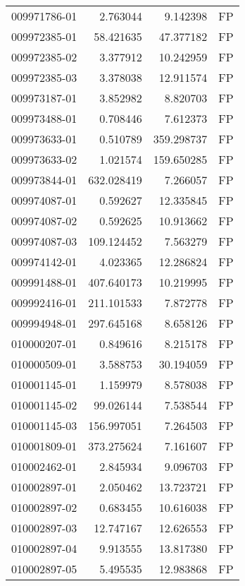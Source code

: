 \begin{tabular}{lrrl}
009971786-01 &    2.763044 &       9.142398 &   FP \\
009972385-01 &   58.421635 &      47.377182 &   FP \\
009972385-02 &    3.377912 &      10.242959 &   FP \\
009972385-03 &    3.378038 &      12.911574 &   FP \\
009973187-01 &    3.852982 &       8.820703 &   FP \\
009973488-01 &    0.708446 &       7.612373 &   FP \\
009973633-01 &    0.510789 &     359.298737 &   FP \\
009973633-02 &    1.021574 &     159.650285 &   FP \\
009973844-01 &  632.028419 &       7.266057 &   FP \\
009974087-01 &    0.592627 &      12.335845 &   FP \\
009974087-02 &    0.592625 &      10.913662 &   FP \\
009974087-03 &  109.124452 &       7.563279 &   FP \\
009974142-01 &    4.023365 &      12.286824 &   FP \\
009991488-01 &  407.640173 &      10.219995 &   FP \\
009992416-01 &  211.101533 &       7.872778 &   FP \\
009994948-01 &  297.645168 &       8.658126 &   FP \\
010000207-01 &    0.849616 &       8.215178 &   FP \\
010000509-01 &    3.588753 &      30.194059 &   FP \\
010001145-01 &    1.159979 &       8.578038 &   FP \\
010001145-02 &   99.026144 &       7.538544 &   FP \\
010001145-03 &  156.997051 &       7.264503 &   FP \\
010001809-01 &  373.275624 &       7.161607 &   FP \\
010002462-01 &    2.845934 &       9.096703 &   FP \\
010002897-01 &    2.050462 &      13.723721 &   FP \\
010002897-02 &    0.683455 &      10.616038 &   FP \\
010002897-03 &   12.747167 &      12.626553 &   FP \\
010002897-04 &    9.913555 &      13.817380 &   FP \\
010002897-05 &    5.495535 &      12.983868 &   FP \\

\end{tabular}

